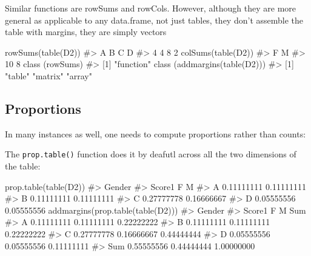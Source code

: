 \documentclass[
  letterpaper,
  DIV=11,
  numbers=noendperiod]{scrreprt}
\newenvironment{Shaded}{\begin{snugshade}}{\end{snugshade}}
\newcommand{\CommentTok}[1]{\textcolor[rgb]{0.37,0.37,0.37}{#1}}
\newcommand{\FunctionTok}[1]{\textcolor[rgb]{0.28,0.35,0.67}{#1}}
\newcommand{\NormalTok}[1]{\textcolor[rgb]{0.00,0.23,0.31}{#1}}
\begin{document}
Similar functions are rowSums and rowCols. However, although they are
more general as applicable to any data.frame, not just tables, they
don't assemble the table with margins, they are simply vectors

\begin{Shaded}
\begin{Highlighting}[]
\FunctionTok{rowSums}\NormalTok{(}\FunctionTok{table}\NormalTok{(D2))}
\CommentTok{\#\textgreater{} A B C D }
\CommentTok{\#\textgreater{} 4 4 8 2}
\FunctionTok{colSums}\NormalTok{(}\FunctionTok{table}\NormalTok{(D2))}
\CommentTok{\#\textgreater{}  F  M }
\CommentTok{\#\textgreater{} 10  8}
\FunctionTok{class}\NormalTok{ (rowSums)}
\CommentTok{\#\textgreater{} [1] "function"}
\FunctionTok{class}\NormalTok{ (}\FunctionTok{addmargins}\NormalTok{(}\FunctionTok{table}\NormalTok{(D2)))}
\CommentTok{\#\textgreater{} [1] "table"  "matrix" "array"}
\end{Highlighting}
\end{Shaded}

\subsection{Proportions}\label{proportions}

In many instances as well, one needs to compute proportions rather than
counts:

The \texttt{prop.table()} function does it by deafutl across all the two
dimensions of the table:

\begin{Shaded}
\begin{Highlighting}[]
\FunctionTok{prop.table}\NormalTok{(}\FunctionTok{table}\NormalTok{(D2))}
\CommentTok{\#\textgreater{}       Gender}
\CommentTok{\#\textgreater{} Score1          F          M}
\CommentTok{\#\textgreater{}      A 0.11111111 0.11111111}
\CommentTok{\#\textgreater{}      B 0.11111111 0.11111111}
\CommentTok{\#\textgreater{}      C 0.27777778 0.16666667}
\CommentTok{\#\textgreater{}      D 0.05555556 0.05555556}
\FunctionTok{addmargins}\NormalTok{(}\FunctionTok{prop.table}\NormalTok{(}\FunctionTok{table}\NormalTok{(D2)))}
\CommentTok{\#\textgreater{}       Gender}
\CommentTok{\#\textgreater{} Score1          F          M        Sum}
\CommentTok{\#\textgreater{}    A   0.11111111 0.11111111 0.22222222}
\CommentTok{\#\textgreater{}    B   0.11111111 0.11111111 0.22222222}
\CommentTok{\#\textgreater{}    C   0.27777778 0.16666667 0.44444444}
\CommentTok{\#\textgreater{}    D   0.05555556 0.05555556 0.11111111}
\CommentTok{\#\textgreater{}    Sum 0.55555556 0.44444444 1.00000000}
\end{Highlighting}
\end{Shaded}
\end{document}
